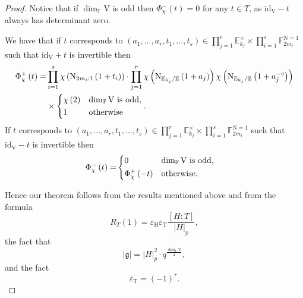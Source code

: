 \documentclass[12pt, reqno]{amsart}
\theoremstyle{definition}
\theoremstyle{definition}
\theoremstyle{definition}
\newcommand{\multiplicativegroup}[1]{#1^{\times}}
\newcommand{\idmap}{\mathrm{id}}
\newcommand{\sizeof}[1]{\left|#1\right|}
\newcommand{\hermitianSpace}{\mathrm{V}}
\newcommand{\grpIndex}[2]{\left[#1:#2\right]}
\newcommand{\minusInvolution}[1]{#1^{-c}}
\newcommand{\FieldNorm}[2]{\mathrm{N}_{#1:#2}}
\newcommand{\aFieldNorm}{\mathrm{N}}
\newcommand{\finiteField}{\mathbb{F}}
\newcommand{\quadraticExtension}{\mathbb{E}}
\newcommand{\finiteFieldExtension}[1]{\finiteField_{#1}}
\newcommand{\quadraticFieldExtension}[1]{\quadraticExtension_{#1}}
\newcommand{\NormOneGroup}[1]{\finiteFieldExtension{#1}^{\aFieldNorm = 1}}
\newcommand{\posJacobiKernel}[1]{\Phi^{+}_{#1}}
\newcommand{\negJacobiKernel}[1]{\Phi^{-}_{#1}}
\newcommand{\lieAlgebra}{\mathfrak{g}}
\newcommand{\algebraicGroup}[1]{\boldsymbol{\mathrm{#1}}}
\begin{document}
\begin{proof}
	Notice that if $\dim_{\finiteField} \hermitianSpace$ is odd then $\negJacobiKernel{\chi}\left(t\right) = 0$ for any $t \in T$, as $\idmap_{\hermitianSpace} - t$ always has determinant zero.
	
	We have that if $t$ corresponds to $\left(a_1,\dots,a_r,t_1,\dots,t_s\right) \in \prod_{j=1}^r \multiplicativegroup{\quadraticFieldExtension{k_j}} \times \prod_{i=1}^s \NormOneGroup{2m_i}$ such that $\idmap_{\hermitianSpace} + t$ is invertible then \begin{align*}
		\posJacobiKernel{\chi}\left(t\right) =& \prod_{i=1}^s \chi\left(\FieldNorm{2m_i}{1}\left(1 + t_i\right)\right) \cdot \prod_{j=1}^r \chi\left(\aFieldNorm_{\quadraticFieldExtension{k_j} / \quadraticExtension}\left(1 + a_j\right)\right) \chi\left(\aFieldNorm_{\quadraticFieldExtension{k_j} / \quadraticExtension}\left(1 + \minusInvolution{a_j}\right)\right) \\
		& \times  \begin{dcases}
			\chi\left(2\right) & \dim_{\finiteField} \hermitianSpace \text{ is odd},\\
			1 & \text{otherwise}
		\end{dcases}.
	\end{align*}
	If $t$ corresponds to $\left(a_1,\dots,a_r,t_1,\dots,t_s\right) \in \prod_{j=1}^r \multiplicativegroup{\quadraticFieldExtension{k_j}} \times \prod_{i=1}^s \NormOneGroup{2m_i}$ such that $\idmap_{\hermitianSpace} - t$ is invertible then \begin{align*}
		\negJacobiKernel{\chi}\left(t\right) =& \begin{dcases}
			0 & \dim_{\finiteField} \hermitianSpace \text{ is odd},\\
			\posJacobiKernel{\chi}\left(-t\right) & \text{otherwise.}
		\end{dcases}
	\end{align*}
	

	
	Hence our theorem follows from the results mentioned above and from the formula $$R_T\left(1\right) = \varepsilon_{\algebraicGroup{H}} \varepsilon_{\algebraicGroup{T}} \frac{\grpIndex{H}{T}}{\sizeof{H}_p},$$ the fact that $$ \sizeof{\lieAlgebra} = \sizeof{H}_p^2 \cdot q^{\frac{\dim_{\finiteField} \hermitianSpace}{2}},$$
	and the fact \begin{equation*}
		\varepsilon_{\algebraicGroup{T}} = \left(-1\right)^r.
	\end{equation*}
\end{proof}
\end{document}

